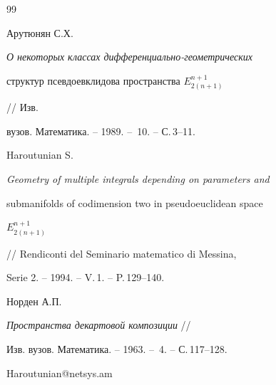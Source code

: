 \begin{thebibliography}{99}


Арутюнян С.Х.


{\em О некоторых классах дифференциально-геометрических


структур псевдоевклидова пространства $E^{n+1}_{2(n+1)}$} // Изв.


вузов. Математика. -- 1989. -- \No\,10. -- С.\,3--11.




Haroutunian S.


{\em Geometry of multiple integrals depending on parameters and


submanifolds of codimension two in pseudoeuclidean space


$E^{n+1}_{2(n+1)}$} // Rendiconti del Seminario matematico di Messina,


Serie 2. -- 1994. -- V.\,1. -- P.\,129--140.




Норден А.П.


{\em Пространства декартовой композиции} //


Изв. вузов. Математика. -- 1963. -- \No\,4. -- С.\,117--128.





\end{thebibliography}





\vskip 2cm














\label{end}











 














Haroutunian@netsys.am


